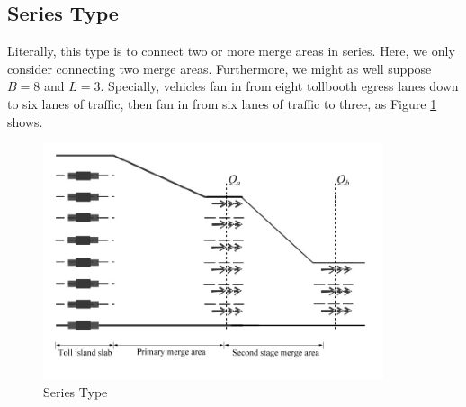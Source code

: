 \documentclass{mcmthesis}
\begin{document}
\subsection{Series Type}
Literally, this type is to connect two or more merge
areas in series. Here, we only consider connecting
two merge areas. Furthermore, we might as well suppose
$B=8$ and $L=3$. Specially, vehicles fan in from eight
tollbooth egress lanes down to six lanes of traffic,
then fan in from six lanes of traffic to three, as
Figure \ref{fig8} shows.
\begin{figure}[h]
\small
\centering
\includegraphics[width=10cm]{figure8}
\caption{Series Type}\label{fig8}
\end{figure}
\end{document}
